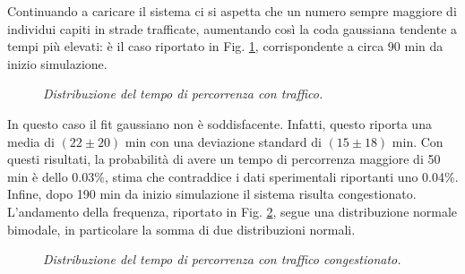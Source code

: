 \documentclass[../main.tex]{subfiles}
\begin{document}
Continuando a caricare il sistema ci si aspetta che un numero sempre maggiore di individui capiti in strade trafficate, aumentando cos\`i la coda gaussiana tendente a tempi pi\`u elevati: \`e il caso riportato in Fig. \ref{fig:frequency_flow}, corrispondente a circa 90 min da inizio simulazione.
\begin{figure}[H]
    \centering
    \caption[Distribuzione del tempo di percorrenza con traffico]{\emph{Distribuzione del tempo di percorrenza con traffico.}}
    \label{fig:frequency_flow}
\end{figure}
In questo caso il fit gaussiano non \`e soddisfacente. Infatti, questo riporta una media di $(22 \pm 20)$ min con una deviazione standard di $(15 \pm 18)$ min.
Con questi risultati, la probabilit\`a di avere un tempo di percorrenza maggiore di 50 min \`e dello 0.03\%, stima che contraddice i dati sperimentali riportanti uno 0.04\%.
Infine, dopo 190 min da inizio simulazione il sistema risulta congestionato.
L'andamento della frequenza, riportato in Fig. \ref{fig:frequency_congested_flow}, segue una distribuzione normale bimodale, in particolare la somma di due distribuzioni normali.
\begin{figure}[H]
    \centering
    \caption[Distribuzione del tempo di percorrenza con traffico congestionato]{\emph{Distribuzione del tempo di percorrenza con traffico congestionato.}}
    \label{fig:frequency_congested_flow}
\end{figure}
\end{document}
